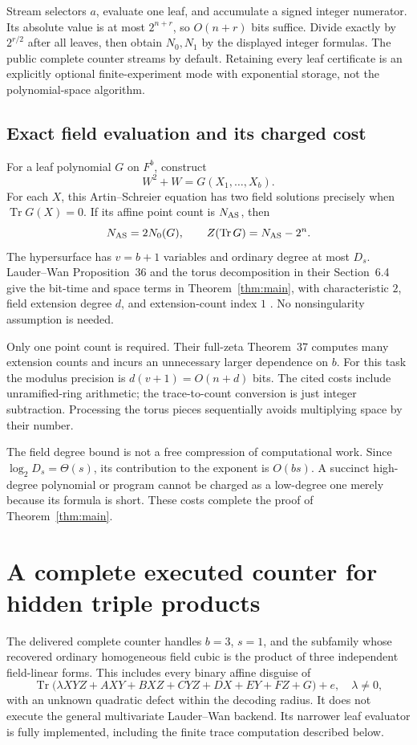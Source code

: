 \documentclass[11pt]{article}
\theoremstyle{remark}\newtheorem{remark}[theorem]{Remark}
\newcommand{\Tr}{\operatorname{Tr}}
\begin{document}
Stream selectors $a$, evaluate one leaf, and accumulate a signed integer numerator. Its absolute value is at most $2^{n+r}$, so $O(n+r)$ bits suffice. Divide exactly by $2^{r/2}$ after all leaves, then obtain $N_0,N_1$ by the displayed integer formulas. The public complete counter streams by default. Retaining every leaf certificate is an explicitly optional finite-experiment mode with exponential storage, not the polynomial-space algorithm.

\subsection{Exact field evaluation and its charged cost}
For a leaf polynomial $G$ on $F^b$, construct
\[
 W^2+W=G(X_1,\ldots,X_b).
\]
For each $X$, this Artin--Schreier equation has two field solutions precisely when $\Tr G(X)=0$. If its affine point count is $N_{\rm AS}$, then
\[
 N_{\rm AS}=2N_0(G),\qquad Z(\Tr G)=N_{\rm AS}-2^n.
\]
The hypersurface has $v=b+1$ variables and ordinary degree at most $D_s$. Lauder--Wan Proposition~36 and the torus decomposition in their Section~6.4 give the bit-time and space terms in Theorem~\ref{thm:main}, with characteristic $2$, field extension degree $d$, and extension-count index $1$ \cite{lauderwan}. No nonsingularity assumption is needed.

Only one point count is required. Their full-zeta Theorem~37 computes many extension counts and incurs an unnecessary larger dependence on $b$. For this task the modulus precision is $d(v+1)=O(n+d)$ bits. The cited costs include unramified-ring arithmetic; the trace-to-count conversion is just integer subtraction. Processing the torus pieces sequentially avoids multiplying space by their number.

The field degree bound is not a free compression of computational work. Since $\log_2D_s=\Theta(s)$, its contribution to the exponent is $O(bs)$. A succinct high-degree polynomial or program cannot be charged as a low-degree one merely because its formula is short. These costs complete the proof of Theorem~\ref{thm:main}.

\section{A complete executed counter for hidden triple products}\label{sec:complete}
The delivered complete counter handles $b=3$, $s=1$, and the subfamily whose recovered ordinary homogeneous field cubic is the product of three independent field-linear forms. This includes every binary affine disguise of
\[
 \Tr\bigl(\lambda XYZ+A XY+B XZ+C YZ+D X+E Y+F Z+G\bigr)+e,
 \quad \lambda\ne0,
\]
with an unknown quadratic defect within the decoding radius. It does not execute the general multivariate Lauder--Wan backend. Its narrower leaf evaluator is fully implemented, including the finite trace computation described below.
\end{document}

